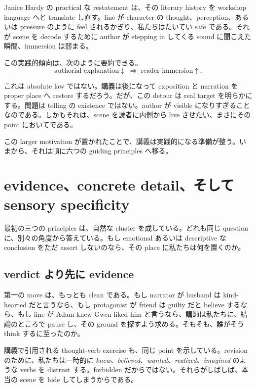 Janice Hardy の practical な restatement は、その literary history を workshop language へと translate し直す。line が character の thought、perception、あるいは pressure のように feel されるかぎり、私たちはたいてい safe である。それが scene を decode するために author が stepping in してくる sound に聞こえた瞬間、immersion は弱まる。

この実践的傾向は、次のように要約できる。
\begin{equation}
\text{authorial explanation} \downarrow \;\Longrightarrow\; \text{reader immersion} \uparrow.
\end{equation}

これは absolute law ではない。講義は後になって exposition と narration を proper place へ restore するだろう。だが、この detour は real target を明らかにする。問題は telling の existence ではない。author が visible になりすぎることなのである。しかもそれは、scene を読者に内側から live させたい、まさにその point においてである。

この larger motivation が置かれたことで、講義は実践的になる準備が整う。いまから、それは順に六つの guiding principles へ移る。

\section{evidence、concrete detail、そして sensory specificity}

最初の三つの principles は、自然な cluster を成している。どれも同じ question に、別々の角度から答えている。もし emotional あるいは descriptive な conclusion をただ assert しないのなら、その place に私たちは何を置くのか。

\subsection{verdict より先に evidence}

第一の move は、もっとも clean である。もし narrator が husband は kind-hearted だと言うなら、もし protagonist が friend は guilty だと believe するなら、もし line が Adam knew Gwen liked him と言うなら、講師は私たちに、結論のところで pause し、その ground を探すよう求める。そもそも、誰がそう think するに至ったのか。

講義で引用される thought-verb exercise も、同じ point を示している。revision のために、私たちは一時的に \emph{knew}、\emph{believed}、\emph{wanted}、\emph{realized}、\emph{imagined} のような verbs を distrust する。forbidden だからではない。それらがしばしば、本当の scene を hide してしまうからである。

